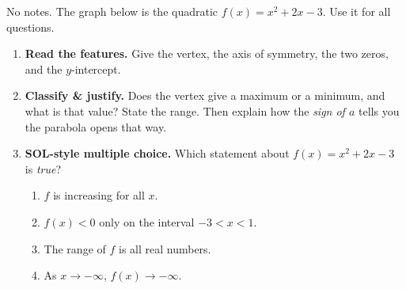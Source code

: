 \documentclass[10pt]{article}
\newcommand{\lgrid}[4]{%
  \draw[step=1, linegray!40, very thin] (#1,#3) grid (#2,#4);
  \draw[->, semithick, charcoal] (#1,0)--(#2,0) node[below right, font=\scriptsize]{$x$};
  \draw[->, semithick, charcoal] (0,#3)--(0,#4) node[left, font=\scriptsize]{$y$};}
\begin{document}

\vspace{0.10in}

No notes. The graph below is the quadratic $f(x) = x^2 + 2x - 3$. Use it for all questions.
\begin{center}
\end{center}

\begin{enumerate}[leftmargin=1.8em, itemsep=10pt]
  \item \textbf{Read the features.} Give the vertex, the axis of symmetry, the two zeros, and the
        $y$-intercept.
        \vspace{0.9cm}
  \item \textbf{Classify \& justify.} Does the vertex give a maximum or a minimum, and what is that
        value? State the range. Then explain how the \emph{sign of $a$} tells you the parabola opens
        that way.
  \item \textbf{SOL-style multiple choice.} Which statement about $f(x)=x^2+2x-3$ is \emph{true}?
        \begin{enumerate}[label=\Alph*., leftmargin=1.9em, itemsep=1pt]
          \item $f$ is increasing for all $x$.
          \item $f(x)<0$ only on the interval $-3<x<1$.
          \item The range of $f$ is all real numbers.
          \item As $x\to-\infty$, $f(x)\to-\infty$.
        \end{enumerate}
\end{enumerate}
\end{document}
